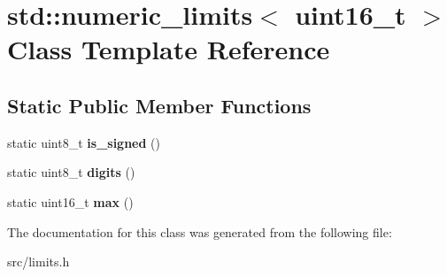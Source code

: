 \hypertarget{classstd_1_1numeric__limits_3_01uint16__t_01_4}{}\section{std\+:\+:numeric\+\_\+limits$<$ uint16\+\_\+t $>$ Class Template Reference}
\label{classstd_1_1numeric__limits_3_01uint16__t_01_4}
\subsection*{Static Public Member Functions}
\begin{DoxyCompactItemize}
\item 
static uint8\+\_\+t {\bfseries is\+\_\+signed} ()\hypertarget{classstd_1_1numeric__limits_3_01uint16__t_01_4_afb86f68ec1ed3973f6112457d8fa25bb}{}\label{classstd_1_1numeric__limits_3_01uint16__t_01_4_afb86f68ec1ed3973f6112457d8fa25bb}

\item 
static uint8\+\_\+t {\bfseries digits} ()\hypertarget{classstd_1_1numeric__limits_3_01uint16__t_01_4_af8baf757e5505a7ee8c78f1e5f98f285}{}\label{classstd_1_1numeric__limits_3_01uint16__t_01_4_af8baf757e5505a7ee8c78f1e5f98f285}

\item 
static uint16\+\_\+t {\bfseries max} ()\hypertarget{classstd_1_1numeric__limits_3_01uint16__t_01_4_ac51d5d78ead4199574e0831c136ca395}{}\label{classstd_1_1numeric__limits_3_01uint16__t_01_4_ac51d5d78ead4199574e0831c136ca395}

\end{DoxyCompactItemize}


The documentation for this class was generated from the following file\+:\begin{DoxyCompactItemize}
\item 
src/limits.\+h\end{DoxyCompactItemize}
